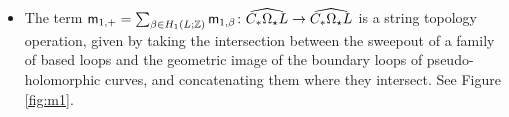 \documentclass[10pt]{amsart}
\numberwithin{equation}{section}
\theoremstyle{plain}
\theoremstyle{definition}
\theoremstyle{remark}
\numberwithin{equation}{section}
\newcommand{\Z}{\mathbb{Z}}
\newcommand{\wh}[1]{\widehat{#1}}
\newcommand{\mm}{\textup{\textsf{m}}}
\begin{document}
\begin{itemize}
\begin{figure}
{\begin{tikzpicture}[x=0.75pt,y=0.75pt,yscale=-1,xscale=1]
\end{tikzpicture}
}
\caption{Definition of $\mm_{0,\beta}$} \label{fig:m0}
\end{figure}


	\item The term $\mm_{1,+} = \sum_{\beta \in H_1(L;\Z)} \mm_{1,\beta}\colon \wh{C_*\Omega_\star L}\to \wh{C_*\Omega_\star L}$ is a string topology operation,  given by taking the intersection between the sweepout of a family of based loops and the geometric image of the boundary loops of pseudo-holomorphic curves, and concatenating them where they intersect. See Figure \ref{fig:m1}.

\begin{figure}
	\centering
{}
\end{figure}
\end{itemize}
\end{document}
